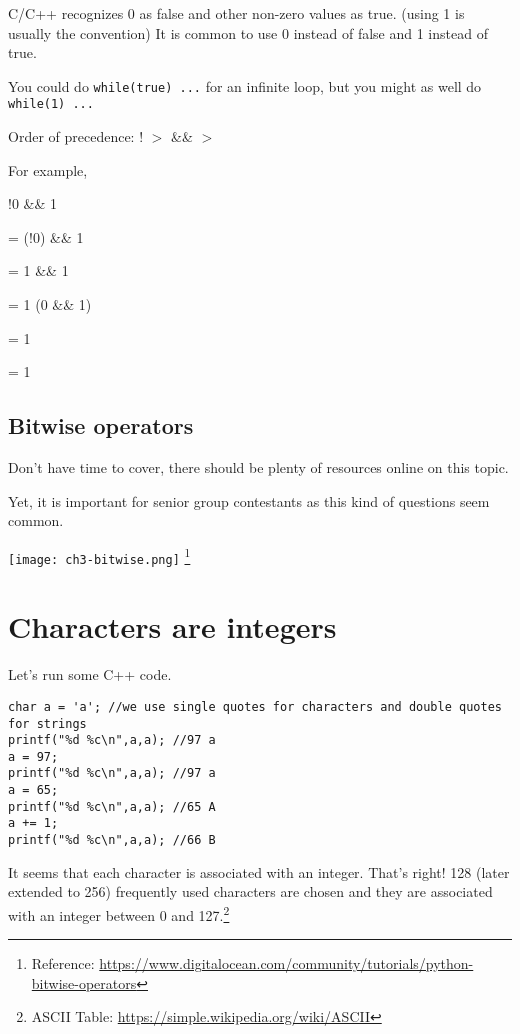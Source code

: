 C/C++ recognizes 0 as false and other non-zero values as true. (using 1 is usually the convention) It is common to use 0 instead of false and 1 instead of true.

You could do \texttt{while(true) ...} for an infinite loop, but you might as well do \texttt{while(1) ...}
\vspace{6mm}

Order of precedence: ! $>$ \&\& $>$ \textbar\textbar

For example, 

!0 \textbar{} \&\& 1

= (!0) \textbar{} \&\& 1

= 1 \textbar{} \&\& 1

= 1 \textbar\textbar (0 \&\& 1)

= 1 \textbar{}

= 1

\subsection{Bitwise operators}

Don't have time to cover, there should be plenty of resources online on this topic. 

Yet, it is important for senior group contestants as this kind of questions seem common. 

\texttt{[image: ch3-bitwise.png]}
\footnote{Reference: \href{https://www.digitalocean.com/community/tutorials/python-bitwise-operators}{https://www.digitalocean.com/community/tutorials/python-bitwise-operators}}

\section{Characters are integers}

Let's run some C++ code.

\begin{lstlisting}
char a = 'a'; //we use single quotes for characters and double quotes for strings
printf("%d %c\n",a,a); //97 a
a = 97;
printf("%d %c\n",a,a); //97 a
a = 65;
printf("%d %c\n",a,a); //65 A
a += 1;
printf("%d %c\n",a,a); //66 B
\end{lstlisting}

It seems that each character is associated with an integer. That's right! 128 (later extended to 256) frequently used characters are chosen and they are associated with an integer between 0 and 127.\footnote{ASCII Table: \href{https://simple.wikipedia.org/wiki/ASCII}{https://simple.wikipedia.org/wiki/ASCII}}

